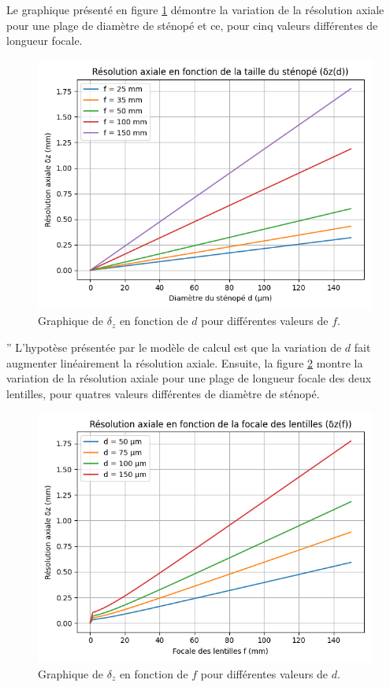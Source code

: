 \documentclass[11pt,letterpaper]{article}
\begin{document}
Le graphique présenté en figure \ref{respin} démontre la variation de la résolution axiale pour une
plage de diamètre de sténopé et ce, pour cinq valeurs différentes de longueur focale.

\begin{figure}[H]
  \centering
  \includegraphics[scale=0.7]{res_vs_pinhole.png}
  \caption{Graphique de $\delta_{z}$ en fonction de $d$ pour différentes valeurs de $f$.}
  \label{respin}
\end{figure}
''
L'hypotèse présentée par le modèle de calcul est que la variation de $d$ fait augmenter linéairement
la résolution axiale. Ensuite, la figure \ref{resfoc} montre la variation de la résolution axiale pour
une plage de longueur focale des deux lentilles, pour quatres valeurs différentes de diamètre de sténopé.
\begin{figure}[H]
  \centering
  \includegraphics[scale=0.7]{res_vs_focal.png}
  \caption{Graphique de $\delta_{z}$ en fonction de $f$ pour différentes valeurs de $d$.}
  \label{resfoc}
\end{figure}
\end{document}
